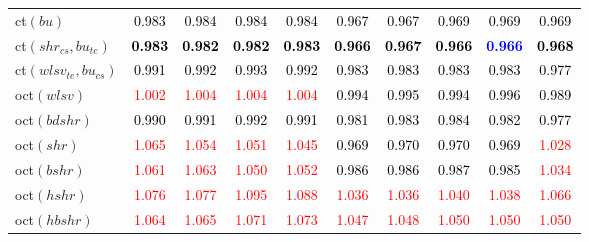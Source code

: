 \begin{tabular}[t]{>{\centering\arraybackslash}m{2.5cm}ccccccccc}
ct$(bu)$ & \textcolor{black}{0.983} & \textcolor{black}{0.984} & \textcolor{black}{0.984} & \textcolor{black}{0.984} & \textcolor{black}{0.967} & \textcolor{black}{0.967} & \textcolor{black}{0.969} & \textcolor{black}{0.969} & \textcolor{black}{0.969}\\
ct$(shr_{cs}, bu_{te})$ & \textcolor{black}{\textbf{0.983}} & \textcolor{black}{\textbf{0.982}} & \textcolor{black}{\textbf{0.982}} & \textcolor{black}{\textbf{0.983}} & \textcolor{black}{\textbf{0.966}} & \textcolor{black}{\textbf{0.967}} & \textcolor{black}{\textbf{0.966}} & \textcolor{blue}{\textbf{0.966}} & \textcolor{black}{\textbf{0.968}}\\
ct$(wlsv_{te}, bu_{cs})$ & \textcolor{black}{0.991} & \textcolor{black}{0.992} & \textcolor{black}{0.993} & \textcolor{black}{0.992} & \textcolor{black}{0.983} & \textcolor{black}{0.983} & \textcolor{black}{0.983} & \textcolor{black}{0.983} & \textcolor{black}{0.977}\\
oct$(wlsv)$ & \textcolor{red}{1.002} & \textcolor{red}{1.004} & \textcolor{red}{1.004} & \textcolor{red}{1.004} & \textcolor{black}{0.994} & \textcolor{black}{0.995} & \textcolor{black}{0.994} & \textcolor{black}{0.996} & \textcolor{black}{0.989}\\
oct$(bdshr)$ & \textcolor{black}{0.990} & \textcolor{black}{0.991} & \textcolor{black}{0.992} & \textcolor{black}{0.991} & \textcolor{black}{0.981} & \textcolor{black}{0.983} & \textcolor{black}{0.984} & \textcolor{black}{0.982} & \textcolor{black}{0.977}\\
oct$(shr)$ & \textcolor{red}{1.065} & \textcolor{red}{1.054} & \textcolor{red}{1.051} & \textcolor{red}{1.045} & \textcolor{black}{0.969} & \textcolor{black}{0.970} & \textcolor{black}{0.970} & \textcolor{black}{0.969} & \textcolor{red}{1.028}\\
oct$(bshr)$ & \textcolor{red}{1.061} & \textcolor{red}{1.063} & \textcolor{red}{1.050} & \textcolor{red}{1.052} & \textcolor{black}{0.986} & \textcolor{black}{0.986} & \textcolor{black}{0.987} & \textcolor{black}{0.985} & \textcolor{red}{1.034}\\
oct$(hshr)$ & \textcolor{red}{1.076} & \textcolor{red}{1.077} & \textcolor{red}{1.095} & \textcolor{red}{1.088} & \textcolor{red}{1.036} & \textcolor{red}{1.036} & \textcolor{red}{1.040} & \textcolor{red}{1.038} & \textcolor{red}{1.066}\\
oct$(hbshr)$ & \textcolor{red}{1.064} & \textcolor{red}{1.065} & \textcolor{red}{1.071} & \textcolor{red}{1.073} & \textcolor{red}{1.047} & \textcolor{red}{1.048} & \textcolor{red}{1.050} & \textcolor{red}{1.050} & \textcolor{red}{1.050}\\

\end{tabular}
